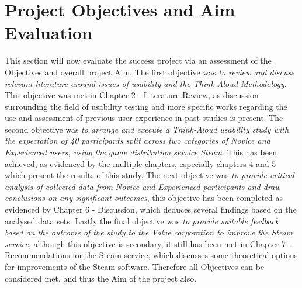 \section{Project Objectives and Aim Evaluation}

This section will now evaluate the success project via an assessment of the Objectives and overall project Aim. The first objective was \textit{to review and discuss relevant literature around issues of usability and the Think-Aloud Methodology}. This objective was met in Chapter 2 - Literature Review, as discussion surrounding the field of usability testing and more specific works regarding the use and assessment of previous user experience in past studies is present. The second objective was \textit{to arrange and execute a Think-Aloud usability study with the expectation of 40 participants split across two categories of Novice and Experienced users, using the game distribution service Steam}. This has been achieved, as evidenced by the multiple chapters, especially chapters 4 and 5 which present the results of this study. The next objective was \textit{to provide critical analysis of collected data from Novice and Experienced participants and draw conclusions on any significant outcomes}, this objective has been completed as evidenced by Chapter 6 - Discussion, which deduces several findings based on the analysed data sets. Lastly the final objective was \textit{to provide suitable feedback based on the outcome of the study to the Valve corporation to improve the Steam service}, although this objective is secondary, it still has been met in Chapter 7 - Recommendations for the Steam service,  which discusses some theoretical options for improvements of the Steam software. Therefore all Objectives can be considered met, and thus the Aim of the project also.

